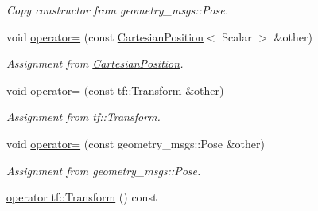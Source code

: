 \begin{DoxyCompactItemize}
\begin{DoxyCompactList}\small\item\em Copy constructor from geometry\+\_\+msgs\+::\+Pose. \end{DoxyCompactList}\item 
void \hyperlink{classow__core_1_1HomogeneousTransformation_ad9b364f7e85270dcb0e3222c29586ba8}{operator=} (const \hyperlink{classow__core_1_1CartesianPosition}{Cartesian\+Position}$<$ Scalar $>$ \&other)\hypertarget{classow__core_1_1HomogeneousTransformation_ad9b364f7e85270dcb0e3222c29586ba8}{}\label{classow__core_1_1HomogeneousTransformation_ad9b364f7e85270dcb0e3222c29586ba8}

\begin{DoxyCompactList}\small\item\em Assignment from \hyperlink{classow__core_1_1CartesianPosition}{Cartesian\+Position}. \end{DoxyCompactList}\item 
void \hyperlink{classow__core_1_1HomogeneousTransformation_a52c2ab8ad47f43b8c94a7d5576e8c842}{operator=} (const tf\+::\+Transform \&other)\hypertarget{classow__core_1_1HomogeneousTransformation_a52c2ab8ad47f43b8c94a7d5576e8c842}{}\label{classow__core_1_1HomogeneousTransformation_a52c2ab8ad47f43b8c94a7d5576e8c842}

\begin{DoxyCompactList}\small\item\em Assignment from tf\+::\+Transform. \end{DoxyCompactList}\item 
void \hyperlink{classow__core_1_1HomogeneousTransformation_a020a141fc151737a9671df9448e954a9}{operator=} (const geometry\+\_\+msgs\+::\+Pose \&other)\hypertarget{classow__core_1_1HomogeneousTransformation_a020a141fc151737a9671df9448e954a9}{}\label{classow__core_1_1HomogeneousTransformation_a020a141fc151737a9671df9448e954a9}

\begin{DoxyCompactList}\small\item\em Assignment from geometry\+\_\+msgs\+::\+Pose. \end{DoxyCompactList}\item 
\hyperlink{classow__core_1_1HomogeneousTransformation_a223412eca2309326b0f672a38c1e6a44}{operator tf\+::\+Transform} () const \hypertarget{classow__core_1_1HomogeneousTransformation_a223412eca2309326b0f672a38c1e6a44}{}\label{classow__core_1_1HomogeneousTransformation_a223412eca2309326b0f672a38c1e6a44}


\end{DoxyCompactItemize}
